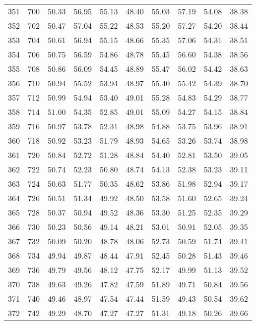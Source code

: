 \begin{longtable}{rrllllllll}
		351 & 700 & 50.33 & 56.95 & 55.13 & 48.40 & 55.03 & 57.19 & 54.08 & 38.38 \\ 
		352 & 702 & 50.47 & 57.04 & 55.22 & 48.53 & 55.20 & 57.27 & 54.20 & 38.44 \\ 
		353 & 704 & 50.61 & 56.94 & 55.15 & 48.66 & 55.35 & 57.06 & 54.31 & 38.51 \\ 
		354 & 706 & 50.75 & 56.59 & 54.86 & 48.78 & 55.45 & 56.60 & 54.38 & 38.56 \\ 
		355 & 708 & 50.86 & 56.09 & 54.45 & 48.89 & 55.47 & 56.02 & 54.42 & 38.63 \\ 
		356 & 710 & 50.94 & 55.52 & 53.94 & 48.97 & 55.40 & 55.42 & 54.39 & 38.70 \\ 
		357 & 712 & 50.99 & 54.94 & 53.40 & 49.01 & 55.28 & 54.83 & 54.29 & 38.77 \\ 
		358 & 714 & 51.00 & 54.35 & 52.85 & 49.01 & 55.09 & 54.27 & 54.15 & 38.84 \\ 
		359 & 716 & 50.97 & 53.78 & 52.31 & 48.98 & 54.88 & 53.75 & 53.96 & 38.91 \\ 
		360 & 718 & 50.92 & 53.23 & 51.79 & 48.93 & 54.65 & 53.26 & 53.74 & 38.98 \\ 
		361 & 720 & 50.84 & 52.72 & 51.28 & 48.84 & 54.40 & 52.81 & 53.50 & 39.05 \\ 
		362 & 722 & 50.74 & 52.23 & 50.80 & 48.74 & 54.13 & 52.38 & 53.23 & 39.11 \\ 
		363 & 724 & 50.63 & 51.77 & 50.35 & 48.62 & 53.86 & 51.98 & 52.94 & 39.17 \\ 
		364 & 726 & 50.51 & 51.34 & 49.92 & 48.50 & 53.58 & 51.60 & 52.65 & 39.24 \\ 
		365 & 728 & 50.37 & 50.94 & 49.52 & 48.36 & 53.30 & 51.25 & 52.35 & 39.29 \\ 
		366 & 730 & 50.23 & 50.56 & 49.14 & 48.21 & 53.01 & 50.91 & 52.05 & 39.35 \\ 
		367 & 732 & 50.09 & 50.20 & 48.78 & 48.06 & 52.73 & 50.59 & 51.74 & 39.41 \\ 
		368 & 734 & 49.94 & 49.87 & 48.44 & 47.91 & 52.45 & 50.28 & 51.43 & 39.46 \\ 
		369 & 736 & 49.79 & 49.56 & 48.12 & 47.75 & 52.17 & 49.99 & 51.13 & 39.52 \\ 
		370 & 738 & 49.63 & 49.26 & 47.82 & 47.59 & 51.89 & 49.71 & 50.84 & 39.56 \\ 
		371 & 740 & 49.46 & 48.97 & 47.54 & 47.44 & 51.59 & 49.43 & 50.54 & 39.62 \\ 
		372 & 742 & 49.29 & 48.70 & 47.27 & 47.27 & 51.31 & 49.18 & 50.26 & 39.66 \\ 

\end{longtable}
